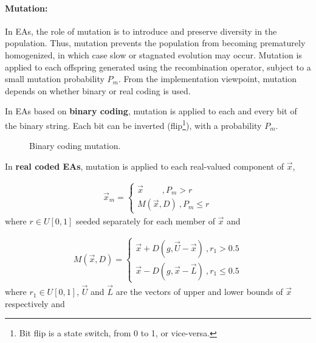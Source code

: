 \FloatBarrier   
\paragraph{Mutation:}
In EAs, the role of mutation is to introduce and preserve diversity in the population. Thus, mutation prevents the population from becoming prematurely homogenized, in which case slow or stagnated evolution may occur. Mutation is applied to each offspring generated using the recombination operator, subject to a small mutation probability $P_m$. From the implementation viewpoint, mutation depends on whether binary or real coding is used.

In EAs based on {\bf binary coding}, mutation is applied to each and every bit of the binary string. Each bit can be inverted (flip\footnote{Bit flip is a state switch, from 0 to 1, or vice-versa.}), with a probability $P_m$.      

\begin{figure}[h!]
\begin{minipage}[b]{1\linewidth}
 \centering
\end{minipage}
\caption{Binary coding mutation.}
\label{binarymut}
\end{figure}

In {\bf real coded EAs},  mutation is applied to each real-valued component of $\vec{x}$, 

\begin{eqnarray}
	\vec{x}_m={\left\{ 
	\begin{array}{ll}
    \vec{x}~~~~~~~~~~,\mbox{$P_m > r$}\\
	M(\vec{x},D)~,\mbox{$P_m \leq r$}
    \end{array} \right. }
    \label{}
\end{eqnarray}
where $r\in U[0,1]$ seeded separately for each member of $\vec{x}$ and

\begin{eqnarray}
	M(\vec{x},D)={\left\{ 
	\begin{array}{ll}
    \vec{x}+D(g,\vec{U}-\vec{x})~,\mbox{$r_1 > 0.5$}\\
	\vec{x}-D(g,\vec{x}-\vec{L})~,\mbox{$r_1 \leq 0.5$}
    \end{array} \right. }
    \label{}
\end{eqnarray}
where $r_1\in U[0,1]$, $\vec{U}$ and $\vec{L}$ are the vectors of upper and lower bounds of $\vec{x}$ respectively and  

